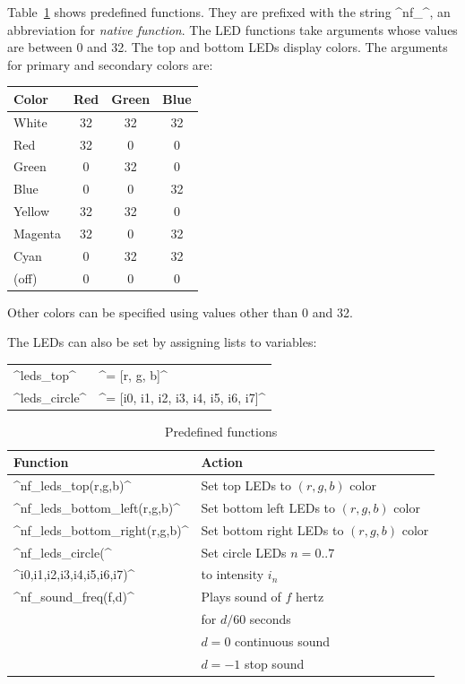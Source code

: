 \documentclass[11pt,a4paper]{article}
\begin{document}
Table~\ref{t.functions} shows predefined functions. They are prefixed with the string ^nf_^, an abbreviation for \emph{native function}. The LED functions take arguments whose values are between 0 and 32. The top and bottom LEDs display colors. The arguments for primary and secondary colors are:
\begin{center}
\begin{tabular}{lccc}
Color & Red & Green & Blue\\\hline
White & 32 & 32 &32\\
Red & 32 & 0 & 0\\
Green & 0 & 32 &0\\
Blue & 0 &0 &32\\
Yellow & 32 & 32 & 0\\ 
Magenta & 32 & 0 & 32\\
Cyan & 0 & 32& 32\\
(off) & 0 & 0 & 0
\end{tabular}
\end{center}
Other colors can be specified using values other than 0 and 32.

The LEDs can also be set by assigning lists to variables:
\begin{center}
\begin{tabular}{|ll|}
\hline
^leds_top^ &^= [r, g, b]^\\
^leds_circle^& ^= [i0, i1, i2, i3, i4, i5, i6, i7]^\\
\hline
\end{tabular}
\end{center}

\begin{table}[hbt]
\renewcommand{\arraystretch}{.85}
\begin{center}
\begin{tabular}{|l|l|}
\hline
Function& Action\\\hline
^nf_leds_top(r,g,b)^&Set top LEDs to $(r,g,b)$ color\\
^nf_leds_bottom_left(r,g,b)^&Set bottom left LEDs to  $(r,g,b)$ color\\
^nf_leds_bottom_right(r,g,b)^&Set bottom right LEDs to $(r,g,b)$ color\\
\hline
^nf_leds_circle(^& Set circle LEDs $n=0..7$\\
\hspace{20pt}^i0,i1,i2,i3,i4,i5,i6,i7)^& \hspace{10pt} to intensity $i_n$\\
\hline
^nf_sound_freq(f,d)^&Plays sound of $f$ hertz\\
&\hspace{15pt}for $d/60$ seconds\\
&\hspace{15pt}$d=0$ continuous sound\\
&\hspace{15pt}$d=-1$ stop sound\\
\hline
\end{tabular}
\end{center}
\caption{Predefined functions}\label{t.functions}
\end{table}
\end{document}

